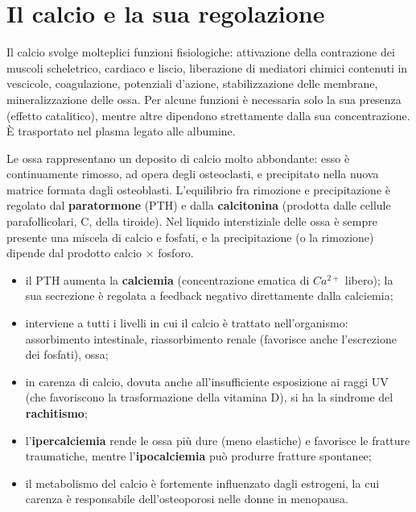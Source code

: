 \section{Il calcio e la sua regolazione}

Il calcio svolge molteplici funzioni fisiologiche: attivazione della
contrazione dei muscoli scheletrico, cardiaco e liscio, liberazione di
mediatori chimici contenuti in vescicole, coagulazione, potenziali
d'azione, stabilizzazione delle membrane, mineralizzazione delle ossa. Per
alcune funzioni è necessaria solo la sua presenza (effetto catalitico),
mentre altre dipendono strettamente dalla sua concentrazione. È trasportato
nel plasma legato alle albumine.

Le ossa rappresentano un deposito di calcio molto abbondante: esso è
continuamente rimosso, ad opera degli osteoclasti, e precipitato nella
nuova matrice formata dagli osteoblasti. L'equilibrio fra rimozione e
precipitazione è regolato dal \textbf{paratormone} (PTH) e dalla
\textbf{calcitonina} (prodotta dalle cellule parafollicolari, C, della
tiroide). Nel liquido interstiziale delle ossa è sempre presente una
miscela di calcio e fosfati, e la precipitazione (o la rimozione) dipende
dal prodotto calcio $\times$ fosforo.

\begin{itemize}
  \item il PTH aumenta la \textbf{calciemia} (concentrazione ematica di
    $Ca^{2+}$ libero); la sua secrezione è regolata a feedback negativo
    direttamente dalla calciemia;
  \item interviene a tutti i livelli in cui il calcio è trattato
    nell'organismo: assorbimento intestinale, riassorbimento renale (favorisce
    anche l'escrezione dei fosfati), ossa;
  \item in carenza di calcio, dovuta anche all'insufficiente esposizione ai
    raggi UV (che favoriscono la trasformazione della vitamina D), si ha la
    sindrome del \textbf{rachitismo};
  \item l'\textbf{ipercalciemia} rende le ossa più dure (meno elastiche) e
    favorisce le fratture traumatiche, mentre l'\textbf{ipocalciemia} può
    produrre fratture spontanee;
  \item il metabolismo del calcio è fortemente influenzato dagli estrogeni,
    la cui carenza è responsabile dell'osteoporosi nelle donne in menopausa.
\end{itemize}

